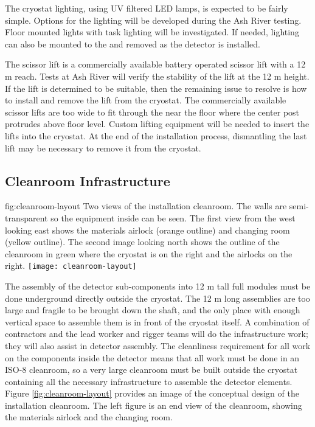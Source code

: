 The cryostat lighting, using UV filtered LED lamps, is expected to be fairly simple. Options for the lighting will be developed during the Ash River testing. Floor mounted lights with task lighting will be investigated. If needed, lighting can also be mounted to the  and removed as the detector is installed.

The scissor lift is a commercially available battery operated scissor lift with a 12 \si{m} reach. Tests at Ash River will verify the stability of the lift at the 12 \si{m} height. If the lift is determined to be suitable, then the remaining issue to resolve is how to install and remove the lift from the cryostat. The commercially available scissor lifts are too wide to fit through the  near the floor where the center post protrudes above floor level. Custom lifting equipment will be needed to insert the lifts into the cryostat. At the end of the installation process, dismantling the last lift may be necessary to remove it from the cryostat.

\clearpage

\subsection{Cleanroom Infrastructure}
\label{sec:fdsp-tc-infr-comm}

\begin{dunefigure}{fig:cleanroom-layout}
  {Two views of the installation cleanroom. The walls are semi-transparent so the equipment inside can be seen. The first view from the west looking east shows the materials airlock (orange outline) and changing room (yellow outline). The second image looking north shows the outline of the cleanroom in green where the cryostat is on the right and the airlocks on the right.} 
\texttt{[image: cleanroom-layout]}
\end{dunefigure}

The assembly of the detector sub-components into 12 \si{m} tall full modules must be done underground directly outside the cryostat. The 12 \si{m} long assemblies are too large and fragile to be brought down the shaft, and the only place with enough vertical space to assemble them is in front of the cryostat itself. A combination of contractors and the lead worker and rigger teams will do the infrastructure work; they will also assist in detector assembly. The cleanliness requirement for all work on the components inside the detector means that all work must be done in an ISO-8 cleanroom, so a very large cleanroom must be built outside the cryostat containing all the necessary infrastructure to assemble the detector  elements. Figure \ref{fig:cleanroom-layout} provides an image of the conceptual design of the installation cleanroom. The left figure is an end view of the cleanroom, showing the materials airlock and the changing room. 

